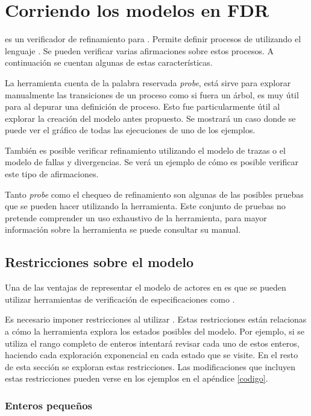 \section{Corriendo los modelos en FDR}

\FDR es un verificador de refinamiento para \CSP. Permite definir procesos de \CSP utilizando el lenguaje \CSPm. Se pueden verificar varias afirmaciones sobre estos procesos. A continuación se cuentan algunas de estas características.

La herramienta cuenta de la palabra reservada \textit{probe}, está sirve para explorar manualmente las transiciones de un proceso como si fuera un árbol, es muy útil para al depurar una definición de proceso. Esto fue particularmente útil al explorar la creación del modelo antes propuesto. Se mostrará un caso donde se puede ver el gráfico de todas las ejecuciones de uno de los ejemplos. 
 
También es posible verificar refinamiento utilizando el modelo de trazas o el modelo de fallas y divergencias. Se verá un ejemplo de cómo es posible verificar este tipo de afirmaciones.

Tanto \textit{probe} como el chequeo de refinamiento son algunas de las posibles pruebas que se pueden hacer utilizando la herramienta. Este conjunto de pruebas no pretende comprender un uso exhaustivo de la herramienta, para mayor información sobre la herramienta se puede consultar su manual\cite{fdrmanual}.

\subsection{Restricciones sobre el modelo}
Una de las ventajas de representar el modelo de actores en \CSP es que se pueden utilizar herramientas de verificación de especificaciones \CSP como \FDR.

Es necesario imponer restricciones al utilizar \FDR. Estas restricciones están relacionas a cómo la herramienta explora los estados posibles del modelo. Por ejemplo, si se utiliza el rango completo de enteros intentará revisar cada uno de estos enteros, haciendo cada exploración exponencial en cada estado que se visite. En el resto de esta sección se exploran estas restricciones. Las modificaciones que incluyen estas restricciones pueden verse en los ejemplos en el apéndice \ref{codigo}.

\subsubsection*{Enteros pequeños}


